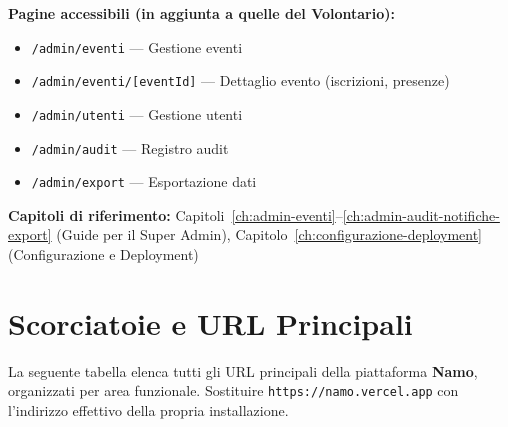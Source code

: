 \documentclass[a4paper,11pt,oneside]{book}
\newcommand{\namo}{\textbf{Namo}}
\newcommand{\percorso}[1]{\textcolor{namoCyan}{\texttt{#1}}}
\begin{document}
\begin{tcolorbox}
\vspace{0.5em}
\textbf{Pagine accessibili (in aggiunta a quelle del Volontario):}
\begin{itemize}[leftmargin=1.5em, topsep=2pt, itemsep=2pt]
  \item \percorso{/admin/eventi} --- Gestione eventi
  \item \percorso{/admin/eventi/[eventId]} --- Dettaglio evento (iscrizioni, presenze)
  \item \percorso{/admin/utenti} --- Gestione utenti
  \item \percorso{/admin/audit} --- Registro audit
  \item \percorso{/admin/export} --- Esportazione dati
\end{itemize}

\vspace{0.5em}
\textbf{Capitoli di riferimento:} Capitoli~\ref{ch:admin-eventi}--\ref{ch:admin-audit-notifiche-export} (Guide per il Super Admin), Capitolo~\ref{ch:configurazione-deployment} (Configurazione e Deployment)
\end{tcolorbox}


\chapter{Scorciatoie e URL Principali}
\label{ch:url-principali}

La seguente tabella elenca tutti gli URL principali della piattaforma \namo{}, organizzati per area funzionale. Sostituire \texttt{https://namo.vercel.app} con l'indirizzo effettivo della propria installazione.
\end{document}
